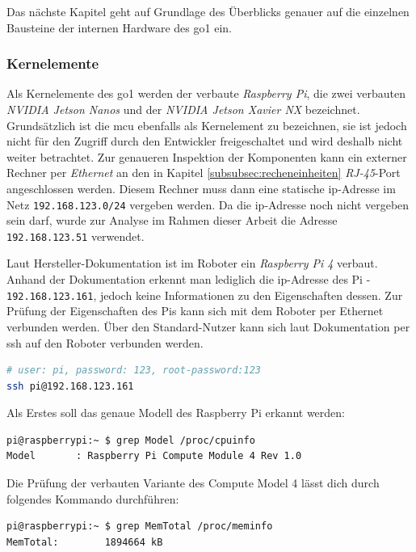 Das nächste Kapitel geht auf Grundlage des Überblicks genauer auf die einzelnen Bausteine der internen Hardware des \gls{go1}
ein.

\subsubsection{Kernelemente}

Als Kernelemente des \gls{go1} werden der verbaute \emph{Raspberry Pi}, die zwei verbauten \emph{NVIDIA Jetson Nanos} und
der \emph{NVIDIA Jetson Xavier NX} bezeichnet.
Grundsätzlich ist die \gls{mcu} ebenfalls als Kernelement zu bezeichnen, sie ist jedoch nicht für den Zugriff durch den
Entwickler freigeschaltet und wird deshalb nicht weiter betrachtet.
Zur genaueren Inspektion der Komponenten kann ein externer Rechner per \emph{Ethernet} an den in Kapitel \ref{subsubsec:recheneinheiten}
\emph{RJ-45}-Port angeschlossen werden.
Diesem Rechner muss dann eine statische \gls{ip}-Adresse im Netz \texttt{192.168.123.0/24} vergeben werden.
Da die \gls{ip}-Adresse noch nicht vergeben sein darf, wurde zur Analyse im Rahmen dieser Arbeit die Adresse \texttt{192.168.123.51}
verwendet.

\label{par:raspi}

Laut Hersteller-Dokumentation ist im Roboter ein \emph{Raspberry Pi \num{4}} verbaut.
Anhand der Dokumentation erkennt man lediglich die \gls{ip}-Adresse des Pi - \texttt{192.168.123.161}, jedoch keine Informationen
zu den Eigenschaften dessen.
Zur Prüfung der Eigenschaften des Pis kann sich mit dem Roboter per Ethernet verbunden werden.
Über den Standard-Nutzer kann sich laut Dokumentation per \gls{ssh} auf den Roboter verbunden werden.

\begin{lstlisting}[language=sh, label=lst:pi-ssh]
# user: pi, password: 123, root-password:123
ssh pi@192.168.123.161
\end{lstlisting}

Als Erstes soll das genaue Modell des Raspberry Pi erkannt werden:

\begin{lstlisting}[language=sh, label=lst:pi-model]
pi@raspberrypi:~ $ grep Model /proc/cpuinfo
Model		: Raspberry Pi Compute Module 4 Rev 1.0
\end{lstlisting}

Die Prüfung der verbauten Variante des Compute Model 4 lässt dich durch folgendes Kommando durchführen:

\begin{lstlisting}[language=sh, label=lst:pi-ram]
pi@raspberrypi:~ $ grep MemTotal /proc/meminfo
MemTotal:        1894664 kB
\end{lstlisting}

